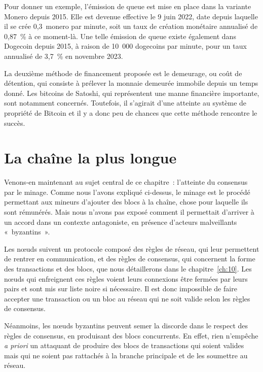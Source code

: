 Pour donner un exemple, l'émission de queue est mise en place dans la variante Monero depuis 2015. Elle est devenue effective le 9 juin 2022, date depuis laquelle il se crée 0,3~monero par minute, soit un taux de création monétaire annualisé de 0,87~\% à ce moment-là. Une telle émission de queue existe également dans Dogecoin depuis 2015, à raison de 10~000 dogecoins par minute, pour un taux annualisé de 3,7~\% en novembre 2023.

La deuxième méthode de financement proposée est le demeurage, ou coût de détention, qui consiste à prélever la monnaie demeurée immobile depuis un temps donné. Les bitcoins de Satoshi, qui représentent une manne financière importante, sont notamment concernés. Toutefois, il s'agirait d'une atteinte au système de propriété de Bitcoin et il y a donc peu de chances que cette méthode rencontre le succès.

\section*{La chaîne la plus longue}

Venons-en maintenant au sujet central de ce chapitre~: l'atteinte du consensus par le minage. Comme nous l'avons expliqué ci-dessus, le minage est le procédé permettant aux mineurs d'ajouter des blocs à la chaîne, chose pour laquelle ils sont rémunérés. Mais nous n'avons pas exposé comment il permettait d'arriver à un accord dans un contexte antagoniste, en présence d'acteurs malveillants «~byzantins~».

Les nœuds suivent un protocole composé des règles de réseau, qui leur permettent de rentrer en communication, et des règles de consensus, qui concernent la forme des transactions et des blocs, que nous détaillerons dans le chapitre~\ref{ch:10}. Les nœuds qui enfreignent ces règles voient leurs connexions être fermées par leurs pairs et sont mis sur liste noire si nécessaire. Il est donc impossible de faire accepter une transaction ou un bloc au réseau qui ne soit valide selon les règles de consensus.

Néanmoins, les nœuds byzantins peuvent semer la discorde dans le respect des règles de consensus, en produisant des blocs concurrents. En effet, rien n'empêche \emph{a priori} un attaquant de produire des blocs de transactions qui soient valides mais qui ne soient pas rattachés à la branche principale et de les soumettre au réseau.

